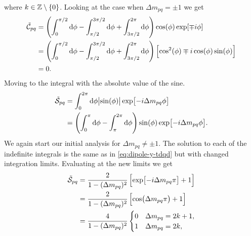         where $k \in \mathbb{Z} \setminus \left\{ 0 \right\}$.
        Looking at the case when $\Delta m_{pq} = \pm 1$ we get
        \begin{align}
            \tilde{\mathcal{C}}_{pq}
            &=
            \left( 
                \int_{0}^{\pi/2}
                \dd \phi
                -
                \int_{\pi/2}^{3\pi/2}
                \dd \phi
                +
                \int_{3\pi/2}^{2\pi}
                \dd \phi
             \right)
            \cos(\phi)
            \exp[\mp i\phi]
            \\
            &=
            \left( 
                \int_{0}^{\pi/2}
                \dd \phi
                -
                \int_{\pi/2}^{3\pi/2}
                \dd \phi
                +
                \int_{3\pi/2}^{2\pi}
                \dd \phi
             \right)
            \left[ 
                \cos^2(\phi)
                \mp i \cos(\phi)\sin(\phi)
             \right]
            \\
            &= 0.
        \end{align}
        Moving to the integral with the absolute value of the sine.
        \begin{align}
            \tilde{\mathcal{S}}_{pq}
            &= \int_{0}^{2\pi} \dd \phi
            \abs{\sin(\phi)}
            \exp[-i\Delta m_{pq} \phi]
            \\
            &= \left( 
                \int_{0}^{\pi} \dd \phi
                - \int_{\pi}^{2\pi} \dd \phi
             \right)
            \sin(\phi) \exp[-i\Delta m_{pq} \phi].
        \end{align}
        We again start our initial analysis for $\Delta m_{pq} \neq \pm 1$.
        The solution to each of the indefinite integrals is the same as in
        \autoref{eq:dipole-y-tdqd} but with changed integration limits.
        Evaluating at the new limits we get
        \begin{align}
            \tilde{\mathcal{S}}_{pq}
            &=
            \frac{2}{1 - (\Delta m_{pq})^2}
            \left[ 
                \exp[-i\Delta m_{pq} \pi]
                + 1
             \right]
            \\
            &= \frac{2}{1 - (\Delta m_{pq})^2}
            \left[ 
                \cos(\Delta m_{pq} \pi)
                + 1
             \right]
            \\
            &=
            \frac{4}{1 - (\Delta m_{pq})^2}
            \begin{cases}
                0 & \Delta m_{pq} = 2k + 1, \\
                1 & \Delta m_{pq} = 2k,
            \end{cases}
        \end{align}
